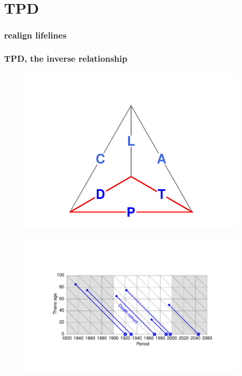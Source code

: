 \documentclass[20pt]{beamer}
\begin{document}
\section{TPD}
\begin{frame} 
\frametitle{realign lifelines}
\begin{figure}
    \centering
\end{figure} 
\end{frame} 

\begin{frame}
\frametitle{TPD, the inverse relationship}
\vspace{-6em}
\begin{figure}
\raggedleft
    \includegraphics[scale=.7]{Figures/TetraTPDprg.pdf}
\end{figure}
\vspace{-3em}
\begin{figure}[b]
    \centering
    \includegraphics{Figures/LabPres/TPD2.pdf}
\end{figure} 
\end{frame}
\end{document}
